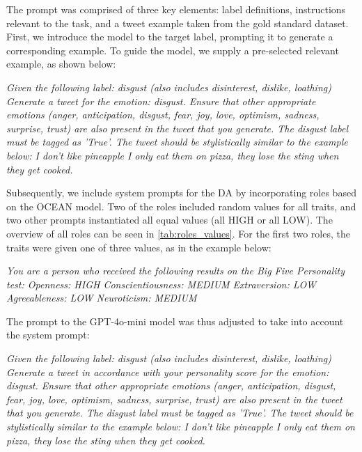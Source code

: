 \documentclass[manuscript]{clv3}
\begin{document}
The prompt was comprised of three key elements: label definitions, instructions relevant to the task, and a tweet example taken from the gold standard dataset. First, we introduce the model to the target label, prompting it to generate a corresponding example. To guide the model, we supply a pre-selected relevant example, as shown below:
\begin{example}
\textit{Given the following label: disgust (also includes disinterest, dislike, loathing) \newline
Generate a tweet for the emotion: disgust. Ensure that other appropriate emotions (anger, anticipation, disgust, fear, joy, love, optimism, sadness, surprise, trust) are also present in the tweet that you generate. The disgust label must be tagged as 'True'. The tweet should be stylistically similar to the example below: \newline
I don't like pineapple I only eat them on pizza, they lose the sting when they get cooked.}
\end{example}
Subsequently, we include system prompts for the DA by incorporating roles based on the OCEAN model. Two of the roles included random values for all traits, and two other prompts instantiated all equal values (all HIGH or all LOW). The overview of all roles can be seen in \autoref{tab:roles_values}. For the first two roles, the traits were given one of three values, as in the example below:
\begin{example}
\textit{You are a person who received the following results on the Big Five Personality test: \newline
Openness: HIGH \newline
Conscientiousness: MEDIUM \newline
Extraversion: LOW \newline
Agreeableness: LOW \newline
Neuroticism: MEDIUM}
\end{example}
The prompt to the GPT-4o-mini model was thus adjusted to take into account the system prompt:
\begin{example}
\textit{Given the following label: disgust (also includes disinterest, dislike, loathing) \newline
Generate a tweet in accordance with your personality score for the emotion: disgust. Ensure that other appropriate emotions (anger, anticipation, disgust, fear, joy, love, optimism, sadness, surprise, trust) are also present in the tweet that you generate. The disgust label must be tagged as 'True'. The tweet should be stylistically similar to the example below: \newline
I don't like pineapple I only eat them on pizza, they lose the sting when they get cooked.}
\end{example}
\end{document}
